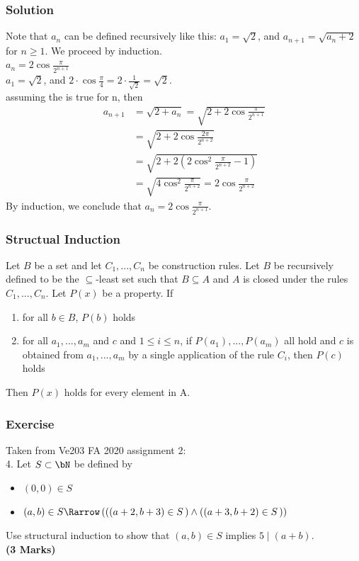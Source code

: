 \documentclass[xcolor=table]{beamer}
\begin{document}
\begin{frame}
    \frametitle{Solution}
    \hh Note that $a_n$ can be defined recursively like this: $a_1 =\sqrt{2}$, and
    $a_{n+1} =\sqrt{a_n+2}$ for $n \geq 1$. We proceed by induction. \\
     $a_n= 2 \cos \frac{\pi}{2^{n+1}}$\\
     $a_1=\sqrt{2}$, and $2\cdot \cos \frac{\pi}{4}= 2\cdot \frac{1}{\sqrt{2}}=\sqrt{2}$.\\ 
     assuming the \textbf{} is true for n, then 
    \begin{equation*}
    \begin{aligned}
        a_{n+1}&=\sqrt{2+a_n}=\sqrt{2+2\cos \frac{\pi}{2^{n+1}}}\\
               &=\sqrt{2+2\cos \frac{2\pi}{2^{n+2}}}\\
               &=\sqrt{2+2(2\cos^2\frac{\pi}{2^{n+2}}-1)}\\
               &=\sqrt{4\cos ^2\frac{\pi}{2^{n+2}}}
               =2\cos \frac{\pi}{2^{n+2}}
    \end{aligned}
    \end{equation*}
    By  induction, we conclude that $a_n = 2 \cos \frac{\pi}{2^{n+1}}$.
\end{frame}
\begin{frame}
    \frametitle{Structual Induction}
    \hh Let $B$ be a set and let $C_1, ..., C_n$ be construction rules. 
    Let $B$ be recursively defined to be the $\subseteq$-least set such that 
    $B \subseteq A$ and $A$ is closed under the rules $C_1, ..., C_n$. 
    Let $P(x)$ be a property. If
    \begin{enumerate}
        \item for all $b \in B$, $P(b)$ holds
        \item for all $a_1, ..., a_m$ and $c$ and $1\leq i\leq n$, 
        if $P(a_1), ..., P(a_m)$ all hold and $c$ is obtained from 
        $a_1, ..., a_m$ by a single application of the rule $C_i$, 
        then $P(c)$ holds
    \end{enumerate}
    Then $P(x)$ holds for every element in A.
\end{frame}
\begin{frame}
    \frametitle{Exercise}
    Taken from Ve203 FA 2020 assignment 2: 
    \\ \vs{2em}
    4. Let $S \subset \bN$ be defined by
    \begin{itemize}
        \item $(0,0)\in S$
        \item $(a,b)\in S \Rarrow \left(\left(\left(a+2,b+3\right)\in S\,\right)\wedge \left(\left(a+3,b+2\right)\in S\,\right)\right)$ 
    \end{itemize}
    Use structural induction to show that $(a, b) \in S$ implies $5 \mid (a + b)$.
    \\\textbf{(3 Marks)}
\end{frame}
\end{document}
